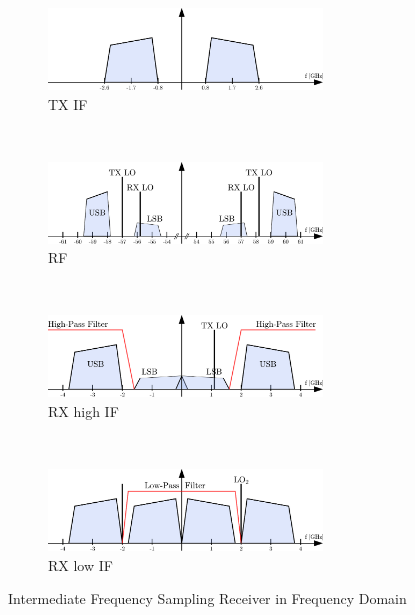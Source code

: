 \begin{figure}[ht]
  \begin{subfigure}{\textwidth}
    \centering
    \includegraphics[width=0.8\textwidth]{figures/if_rx_freq_tx_if}
    \caption{\gls{TX} \gls{IF}}
    \label{fig:rx_if_freq_tx_if}
  \end{subfigure}
  \vspace{8ex} \\
  \begin{subfigure}{\textwidth}
    \centering
    \includegraphics[width=0.8\textwidth]{figures/if_rx_freq_rf}
    \caption{\gls{RF}}
    \label{fig:rx_if_freq_rf}
  \end{subfigure}
  \vspace{8ex} \\
  \begin{subfigure}{\textwidth}
    \centering
    \includegraphics[width=0.8\textwidth]{figures/if_rx_freq_rx_if1}
    \caption{\gls{RX} high \gls{IF}}
    \label{fig:rx_if_freq_rx_if1}
  \end{subfigure}
  \vspace{8ex} \\
  \begin{subfigure}{\textwidth}
    \centering
    \includegraphics[width=0.8\textwidth]{figures/if_rx_freq_rx_if2}
    \caption{\gls{RX} low \gls{IF}}
    \label{fig:rx_if_freq_rx_if2}
  \end{subfigure}
  \caption{Intermediate Frequency Sampling Receiver in Frequency Domain}
  \label{fig:rx_if_freq}
\end{figure}

